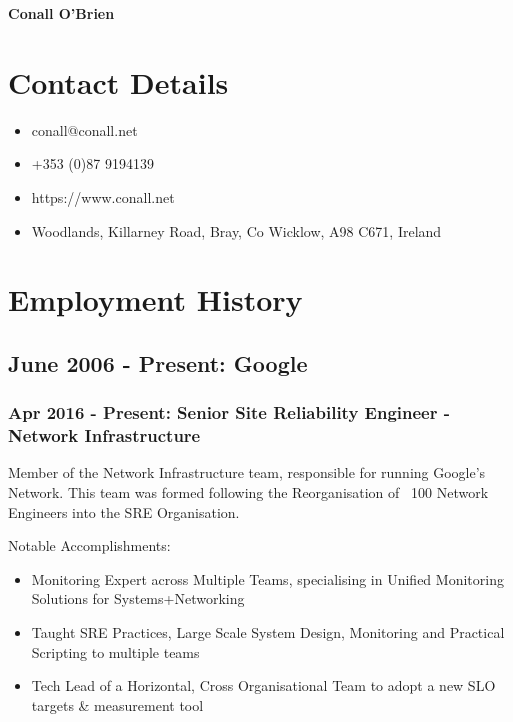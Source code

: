 \documentclass[a4paper, 10pt] {article}
\begin{document}
\begingroup
  \centering
  \LARGE \textbf{Conall O'Brien}\\[1.5em]
\endgroup

\section*{Contact Details}

\begin{itemize}
 \item conall@conall.net
 \item +353 (0)87 9194139
 \item https://www.conall.net
 \item Woodlands, Killarney Road, Bray, Co Wicklow, A98 C671, Ireland
\end{itemize}

\section*{Employment History}

\subsection*{June 2006 - Present: Google}

\subsubsection*{Apr 2016 - Present: Senior Site Reliability Engineer - Network Infrastructure}

Member of the Network Infrastructure team, responsible for running Google's Network. This team was formed
following the Reorganisation of ~100 Network Engineers into the SRE Organisation.

\vspace{5mm} %

Notable Accomplishments:

\begin{itemize}
  \item Monitoring Expert across Multiple Teams, specialising in Unified Monitoring Solutions for Systems+Networking
  \item Taught SRE Practices, Large Scale System Design, Monitoring and Practical Scripting to multiple teams
  \item Tech Lead of a Horizontal, Cross Organisational Team to adopt a new SLO targets \& measurement tool
\end{itemize}
\end{document}
